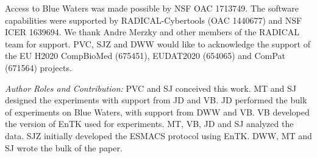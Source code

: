\footnotesize

Access to Blue Waters was made possible by NSF OAC 1713749. The software
capabilities were supported by RADICAL-Cybertools (OAC 1440677) and NSF ICER
1639694. We thank Andre Merzky and other members of the RADICAL team for
support. PVC, SJZ and DWW would like to acknowledge the support of the EU
H2020 CompBioMed (675451), EUDAT2020 (654065) and ComPat (671564) projects.

{\it Author Roles and Contribution:} PVC and SJ conceived this work. MT and SJ
designed the experiments with support from JD and VB. JD performed the bulk of
experiments on Blue Waters, with support from DWW and VB. VB developed the
version of EnTK used for experiments. MT, VB, JD and SJ analyzed the data. SJZ
initially developed the ESMACS protocol using EnTK. DWW, MT and SJ wrote the
bulk of the paper.







